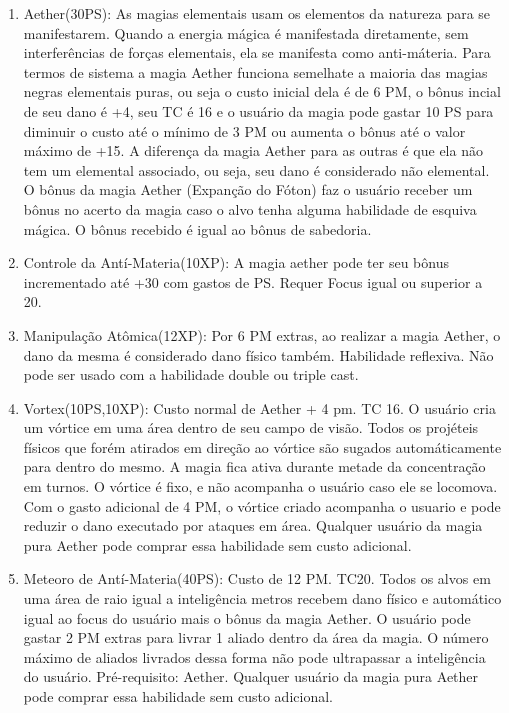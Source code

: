   
\begin{enumerate}

		\item  Aether(30PS): As magias elementais usam os elementos da natureza para se manifestarem. Quando a energia mágica é manifestada diretamente, sem interferências de forças elementais, ela se manifesta como anti-máteria. Para termos de sistema a magia Aether funciona semelhate a maioria das magias negras elementais puras, ou seja o custo inicial dela é de 6 PM, o bônus incial de seu dano é +4, seu TC é 16 e o usuário da magia pode gastar 10 PS para diminuir o custo até o mínimo de 3 PM ou aumenta o bônus até o valor máximo de +15. A diferença da magia Aether para as outras é que ela não tem um elemental associado, ou seja, seu dano é considerado não elemental. O bônus da magia Aether (Expanção do Fóton) faz o usuário receber um bônus no acerto da magia caso o alvo tenha alguma habilidade de esquiva mágica. O bônus recebido é igual ao bônus de sabedoria.  

	 	\item Controle da Antí-Materia(10XP): A magia aether pode ter seu bônus incrementado até +30 com gastos de PS. Requer Focus igual ou superior a 20.
		
		\item Manipulação Atômica(12XP): Por 6 PM extras, ao realizar a magia Aether, o dano da mesma é considerado dano físico também. Habilidade reflexiva. Não pode ser usado com a habilidade double ou triple cast.	

   	
	 	\item Vortex(10PS,10XP): Custo normal de Aether + 4 pm. TC 16.\newline
O usuário cria um vórtice em uma área dentro de seu campo de visão. Todos os projéteis físicos que forém atirados em direção ao vórtice são sugados automáticamente para dentro do mesmo. A magia fica ativa durante metade da concentração em turnos. O vórtice é fixo, e não acompanha o usuário caso ele se locomova. Com o gasto adicional de 4 PM, o vórtice criado acompanha o usuario e pode reduzir o dano executado por ataques em área. Qualquer usuário da magia pura Aether pode comprar essa habilidade sem custo adicional.

  	\item  Meteoro de Antí-Materia(40PS): Custo de 12 PM. TC20. \newline
Todos os alvos em uma área de raio igual a inteligência metros recebem dano físico e automático igual ao focus do usuário mais o bônus da magia Aether. O usuário pode gastar 2 PM extras para livrar 1 aliado dentro da área da magia. O número máximo de aliados livrados dessa forma não pode ultrapassar a inteligência do usuário. Pré-requisito: Aether. Qualquer usuário da magia pura Aether pode comprar essa habilidade sem custo adicional. 
	

\end{enumerate}
